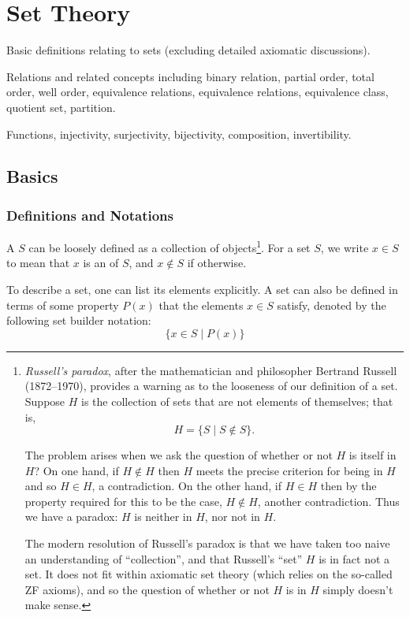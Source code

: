 \chapter{Set Theory}\label{chap:set-theory}

\begin{summary}
\item Basic definitions relating to sets (excluding detailed axiomatic discussions).
\item Relations and related concepts including binary relation, partial order, total order, well order, equivalence relations, equivalence relations, equivalence class, quotient set, partition.
\item Functions, injectivity, surjectivity, bijectivity, composition, invertibility.
\end{summary}

\section{Basics}
\subsection{Definitions and Notations}
A  $S$ can be loosely defined as a collection of objects\footnote{\emph{Russell's paradox}, after the mathematician and philosopher Bertrand Russell (1872--1970), provides a warning as to the looseness of our definition of a set. Suppose $H$ is the collection of sets that are not elements of themselves; that is,
\[H=\{S\mid S\notin S\}.\]

The problem arises when we ask the question of whether or not $H$ is itself in $H$? On one hand, if $H\notin H$ then $H$ meets the precise criterion for being in $H$ and so $H\in H$, a contradiction. On the other hand, if $H\in H$ then by the property required for this to be the case, $H\notin H$, another contradiction. Thus we have a paradox: $H$ is neither in $H$, nor not in $H$.

The modern resolution of Russell's paradox is that we have taken too naive an understanding of ``collection'', and that Russell's ``set'' $H$ is in fact not a set. It does not fit within axiomatic set theory (which relies on the so-called ZF axioms), and so the question of whether or not $H$ is in $H$ simply doesn't make sense.}. For a set $S$, we write $x \in S$ to mean that $x$ is an  of $S$, and $x \notin S$ if otherwise. 

To describe a set, one can list its elements explicitly. A set can also be defined in terms of some property $P(x)$ that the elements $x \in S$ satisfy, denoted by the following set builder notation:
\[\{x\in S \mid P(x)\}\]

